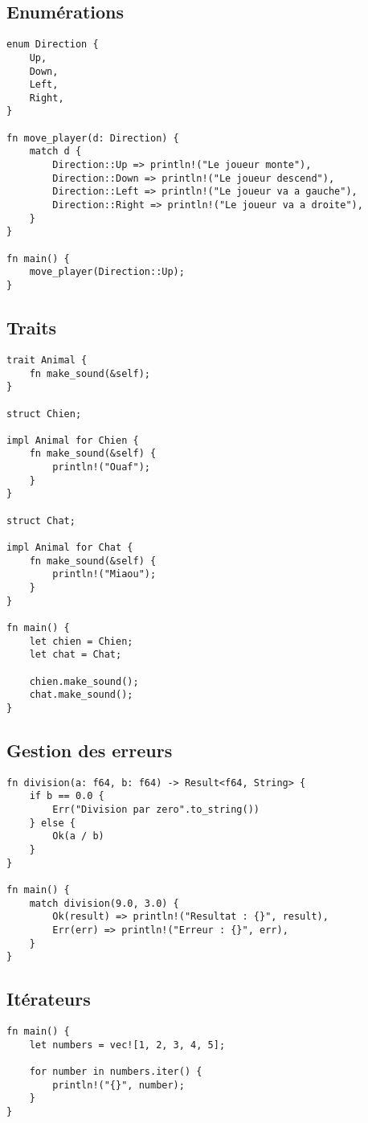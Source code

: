 \documentclass{article}
\begin{document}
\subsection{Enumérations}
\begin{lstlisting}[]
enum Direction {
    Up,
    Down,
    Left,
    Right,
}

fn move_player(d: Direction) {
    match d {
        Direction::Up => println!("Le joueur monte"),
        Direction::Down => println!("Le joueur descend"),
        Direction::Left => println!("Le joueur va a gauche"),
        Direction::Right => println!("Le joueur va a droite"),
    }
}

fn main() {
    move_player(Direction::Up);
}
\end{lstlisting}

\subsection{Traits}
\begin{lstlisting}[]
trait Animal {
    fn make_sound(&self);
}

struct Chien;

impl Animal for Chien {
    fn make_sound(&self) {
        println!("Ouaf");
    }
}

struct Chat;

impl Animal for Chat {
    fn make_sound(&self) {
        println!("Miaou");
    }
}

fn main() {
    let chien = Chien;
    let chat = Chat;

    chien.make_sound();
    chat.make_sound();
}
\end{lstlisting}

\subsection{Gestion des erreurs}
\begin{lstlisting}[]
fn division(a: f64, b: f64) -> Result<f64, String> {
    if b == 0.0 {
        Err("Division par zero".to_string())
    } else {
        Ok(a / b)
    }
}

fn main() {
    match division(9.0, 3.0) {
        Ok(result) => println!("Resultat : {}", result),
        Err(err) => println!("Erreur : {}", err),
    }
}
\end{lstlisting}

\subsection{Itérateurs}
\begin{lstlisting}[]
fn main() {
    let numbers = vec![1, 2, 3, 4, 5];

    for number in numbers.iter() {
        println!("{}", number);
    }
}
\end{lstlisting}
\end{document}
